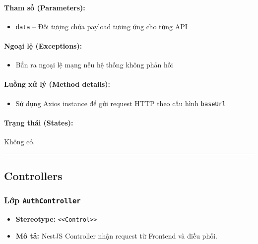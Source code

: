 \documentclass[12pt,a4paper]{article}
\begin{document}
\paragraph{Tham số (Parameters):}
\begin{itemize}[leftmargin=*]
    \item \texttt{data} – Đối tượng chứa payload tương ứng cho từng API
\end{itemize}


\paragraph{Ngoại lệ (Exceptions):}
\begin{itemize}[leftmargin=*]
    \item Bắn ra ngoại lệ mạng nếu hệ thống không phản hồi
\end{itemize}


\paragraph{Luồng xử lý (Method details):}
\begin{itemize}[leftmargin=*]
    \item Sử dụng Axios instance để gửi request HTTP theo cấu hình \texttt{baseUrl}
\end{itemize}


\paragraph{Trạng thái (States):}
Không có.

\vskip 0.5cm
\noindent\rule{\textwidth}{0.5pt}
\vskip 0.5cm

\subsection{Controllers}


\subsubsection{Lớp \texttt{AuthController}}

\begin{itemize}[leftmargin=*]
    \item \textbf{Stereotype:} \texttt{\textless{}\textless{}Control\textgreater{}\textgreater{}}
    \item \textbf{Mô tả:} NestJS Controller nhận request từ Frontend và điều phối.
\end{itemize}
\end{document}
